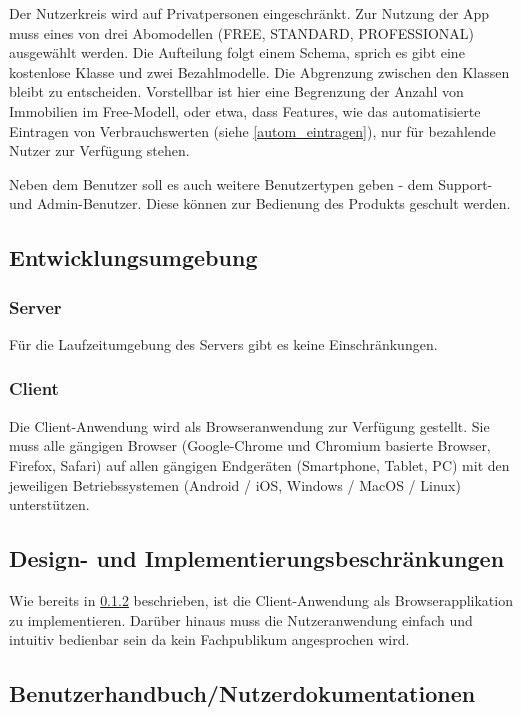 Der Nutzerkreis wird auf Privatpersonen eingeschränkt.
Zur Nutzung der App muss eines von drei Abomodellen (FREE, STANDARD, PROFESSIONAL) ausgewählt werden.
Die Aufteilung folgt einem  Schema, sprich es gibt eine kostenlose Klasse und zwei Bezahlmodelle.
Die Abgrenzung zwischen den Klassen bleibt zu entscheiden.
Vorstellbar ist hier eine Begrenzung der Anzahl von Immobilien im Free-Modell,
oder etwa, dass Features, wie das automatisierte Eintragen von Verbrauchswerten (siehe \ref{autom_eintragen}),
nur für bezahlende Nutzer zur Verfügung stehen.

Neben dem Benutzer soll es auch weitere Benutzertypen geben - dem Support- und Admin-Benutzer.
Diese können zur Bedienung des Produkts geschult werden.

\subsection{Entwicklungsumgebung}

\subsubsection{Server}

Für die Laufzeitumgebung des Servers gibt es keine Einschränkungen.

\subsubsection{Client}
\label{subsec:OEclient}
Die Client-Anwendung wird als Browseranwendung zur Verfügung gestellt.
Sie muss alle gängigen Browser (Google-Chrome und Chromium basierte Browser, Firefox, Safari)
auf allen gängigen Endgeräten (Smartphone, Tablet, PC) mit den jeweiligen Betriebssystemen
(Android / iOS, Windows / MacOS / Linux) unterstützen.

\subsection{Design- und Implementierungsbeschränkungen}

Wie bereits in \ref{subsec:OEclient} beschrieben, ist die Client-Anwendung als Browserapplikation zu implementieren.
Darüber hinaus muss die Nutzeranwendung einfach und intuitiv bedienbar sein da kein Fachpublikum angesprochen wird.

\subsection{Benutzerhandbuch/Nutzerdokumentationen}

